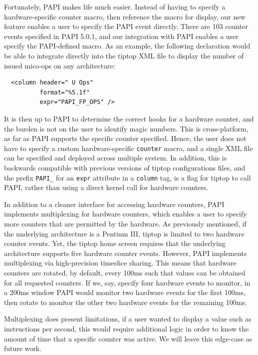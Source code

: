 Fortunately, PAPI makes life much easier.
Instead of having to specify a hardware-specific counter macro, then reference the macro for display, our new feature enables a user to specify the PAPI event directly.
There are 103 counter events specified in PAPI 5.0.1, and our integration with PAPI enables a user specify the PAPI-defined macro.
As an example, the following declaration would be able to integrate directly into the tiptop XML file to display the number of issued mico-ops on any architecture:
\begin{verbatim}
  <column header=" U Ops"
          format="%5.1f"
          expr="PAPI_FP_OPS" />
\end{verbatim}
It is then up to PAPI to determine the correct hooks for a hardware counter, and the burden is not on the user to identify magic numbers.
This is cross-platform, as far as PAPI supports the specific counter specified.
Hence, the user does not have to specify a custom hardware-specific \texttt{counter} macro, and a single XML file can be specified and deployed across multiple system.
In addition, this is backwards compatible with previous versions of tiptop configurations files, and the prefix \texttt{PAPI\_} for an \texttt{expr} attribute in a \texttt{column} tag, is a flag for tiptop to call PAPI, rather than using a direct kernel call for hardware counters.

In addition to a cleaner interface for accessing hardware counters, PAPI implements multiplexing for hardware counters, which enables a user to specify more counters that are permitted by the hardware.
As previously mentioned, if the underlying architecture is a Pentium III, tiptop is limited to two hardware counter events.
Yet, the tiptop home screen requires that the underlying architecture supports five hardware counter events.
However, PAPI implements multiplexing via high-precision timeslice sharing. This means that hardware counters are rotated, by default, every 100ms such that values can be obtained for all requested counters.
If we, say, specify four hardware events to monitor, in a 200ms window PAPI would monitor two hardware events for the first 100ms, then rotate to monitor the other two hardware events for the remaining 100ms.

Multiplexing does present limitations, if a user wanted to display a value such as instructions per second, this would require additional logic in order to know the amount of time that a specific counter was active.
We will leave this edge-case as future work.

